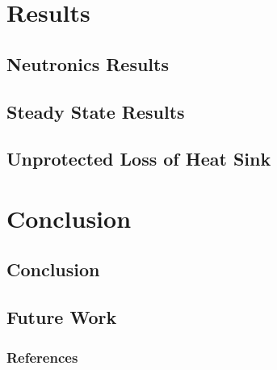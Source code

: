 \documentclass[9pt]{beamer}
\begin{document}
\section{Results}
\subsection{Neutronics Results}

\subsection{Steady State Results}

\subsection{Unprotected Loss of Heat Sink}


\section{Conclusion}
\subsection{Conclusion}

\subsection{Future Work}


\begin{frame}[allowframebreaks]
  \frametitle{References}
  
  {\footnotesize  }

\end{frame}

\end{document}
